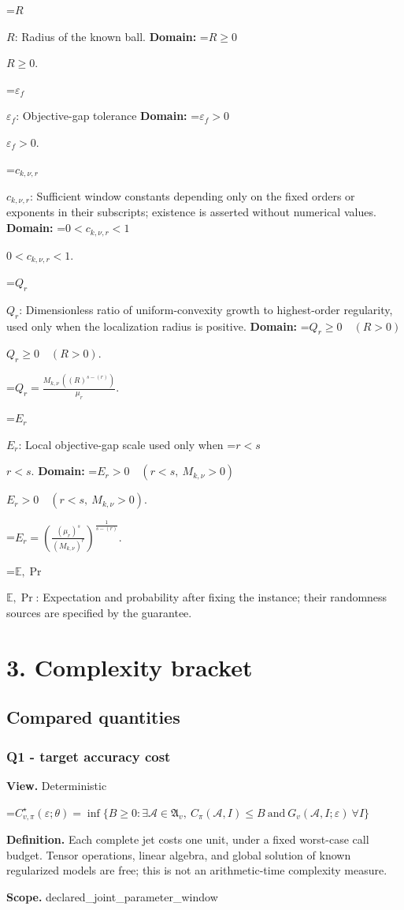 \documentclass[10pt,a4paper]{article}
\newcommand{\AtlasMath}[1]{\par\begingroup\centering\setbox0=\hbox{$\displaystyle #1$}\ifdim\wd0>1.4\linewidth\typeout{ATLAS WIDE FORMULA: \the\wd0}\fi\ifdim\wd0>\linewidth\resizebox{\linewidth}{!}{\box0}\else\box0\fi\par\endgroup}
\newcommand{\AtlasInlineMath}[1]{\begingroup\setbox0=\hbox{$#1$}\ifdim\wd0>.4\linewidth\endgroup\AtlasMath{#1}\else\endgroup$#1$\fi}
\begin{document}
\AtlasInlineMath{R}: Radius of the known ball. \textbf{Domain:} \AtlasInlineMath{R\ge0}.

\AtlasInlineMath{\varepsilon_f}: Objective-gap tolerance \textbf{Domain:} \AtlasInlineMath{\varepsilon_f>0}.

\AtlasInlineMath{c_{k,\nu,r}}: Sufficient window constants depending only on the fixed orders or exponents in their subscripts; existence is asserted without numerical values. \textbf{Domain:} \AtlasInlineMath{0<c_{k,\nu,r}<1}.

\AtlasInlineMath{Q_r}: Dimensionless ratio of uniform-convexity growth to highest-order regularity, used only when the localization radius is positive. \textbf{Domain:} \AtlasInlineMath{Q_r\ge0\quad(R>0)}.


\AtlasMath{Q_r=\frac{M_{k,\nu}\,((R)^{s-(r)})}{\mu_r}.}


\AtlasInlineMath{E_r}: Local objective-gap scale used only when \AtlasInlineMath{r<s}. \textbf{Domain:} \AtlasInlineMath{E_r>0\quad(r<s,\ M_{k,\nu}>0)}.


\AtlasMath{E_r=(\frac{(\mu_r)^{s}}{(M_{k,\nu})^{r}})^{\frac{1}{s-(r)}}.}


\AtlasInlineMath{\mathbb{E},\Pr}: Expectation and probability after fixing the instance; their randomness sources are specified by the guarantee.

\section{3. Complexity bracket}
\subsection{Compared quantities}
\subsubsection{Q1 - target accuracy cost}
\textbf{View.} Deterministic

\AtlasMath{C^\star_{v,\pi}(\varepsilon;\theta)=\inf\{B\ge0:\exists\mathcal A\in\mathfrak A_v,\ C_\pi(\mathcal A,I)\le B\ \text{and}\ G_v(\mathcal A,I;\varepsilon)\ \forall I\}}
\textbf{Definition.} Each complete jet costs one unit, under a fixed worst-case call budget. Tensor operations, linear algebra, and global solution of known regularized models are free; this is not an arithmetic-time complexity measure.

\textbf{Scope.} declared\_joint\_parameter\_window
\end{document}
